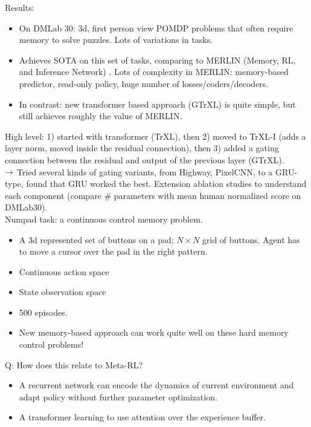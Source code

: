 Results:
\begin{itemize}
    \item On DMLab 30: 3d, first person view POMDP problems that often require memory to solve puzzles. Lots of variations in tasks.
    
    \item Achieves SOTA on this set of tasks, comparing to MERLIN (Memory, RL, and Inference Network) \cite{wayne2018unsupervised}. Lots of complexity in MERLIN: memory-based predictor, read-only policy, huge number of losses/coders/decoders.
    
    \item In contrast: new transformer based approach (GTrXL) is quite simple, but still achieves roughly the value of MERLIN.
\end{itemize}

High level: 1) started with transformer (TrXL), then 2) moved to TrXL-I (adds a layer norm, moved inside the residual connection), then 3) added a gating connection between the residual and output of the previous layer (GTrXL). \\

$\rightarrow$ Tried several kinds of gating variants, from Highway, PixelCNN, to a GRU-type, found that GRU worked the best. Extension ablation studies to understand each component (compare \# parameters with mean human normalized score on DMLab30). \\

Numpad task: a continuous control memory problem.
\begin{itemize}
    \item A 3d represented set of buttons on a pad; $N\times N$ grid of buttons. Agent has to move a cursor over the pad in the right pattern.
    \item Continuous action space
    \item State observation space
    \item 500 episodes.
    \item New memory-based approach can work quite well on these hard memory control problems!
\end{itemize}

Q: How does this relate to Meta-RL?
\begin{itemize}
    \item A recurrent network can encode the dynamics of current environment and adapt policy without further parameter optimization.
    \item A transformer learning to use attention over the experience buffer.
\end{itemize}

